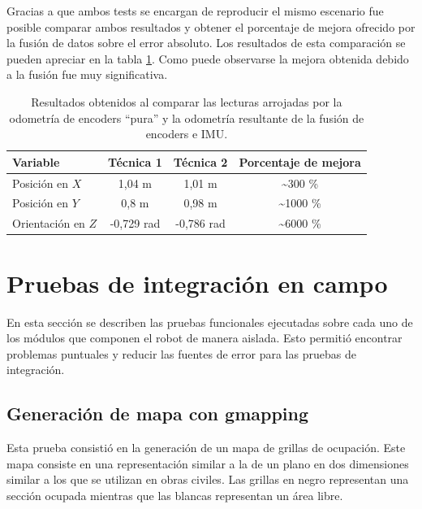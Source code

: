 Gracias a que ambos tests se encargan de reproducir el mismo escenario fue posible comparar ambos resultados y obtener el porcentaje de mejora ofrecido por la fusión de datos sobre el error absoluto. Los resultados de esta comparación se pueden apreciar en la tabla \ref{tab:comparacionOdom}. Como puede observarse la mejora obtenida debido a la fusión fue muy significativa.

\begin{table}[!htbp]
    \centering
    \centering
    \caption[Comparacion de calculos de odometría]{Resultados obtenidos al comparar las lecturas arrojadas por la odometría de encoders ``pura'' y la odometría resultante de la fusión de encoders e IMU.}
    \begin{tabular}{lccc}
        \toprule
        \textbf{Variable}  & \textbf{Técnica 1} & \textbf{Técnica 2} & \textbf{Porcentaje de mejora} \\
        \midrule
        Posición en $X$    & 1,04 m             & 1,01 m             & \textasciitilde300 \%         \\
        Posición en $Y$    & 0,8 m              & 0,98 m             & \textasciitilde1000 \%        \\
        Orientación en $Z$ & -0,729 rad         & -0,786 rad         & \textasciitilde6000 \%        \\
        \bottomrule
    \end{tabular}
    \label{tab:comparacionOdom}
\end{table}


\section{Pruebas de integración en campo}

En esta sección se describen las pruebas funcionales ejecutadas sobre cada uno de los módulos que componen el robot de manera aislada. Esto permitió encontrar problemas puntuales y reducir las fuentes de error para las pruebas de integración.

\subsection{Generación de mapa con gmapping}

Esta prueba consistió en la generación de un mapa de grillas de ocupación. Este mapa consiste en una representación similar a la de un plano en dos dimensiones similar a los que se utilizan en obras civiles. Las grillas en negro representan una sección ocupada mientras que las blancas representan un área libre.


